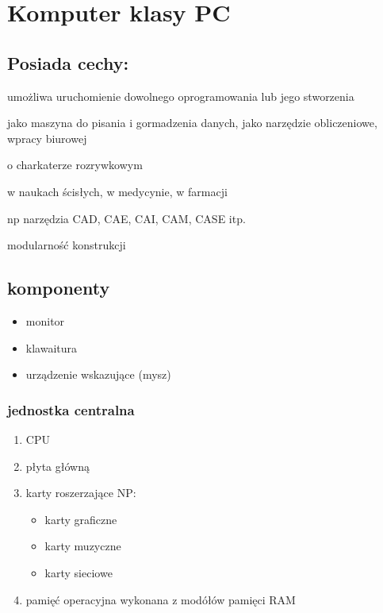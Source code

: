\documentclass[11pt]{article}
\begin{document}
\section{Komputer klasy PC}
\label{sec:orge1d6a24}
\subsection{Posiada cechy:}
\label{sec:org1cc4df4}
\begin{description}
\item[{porgramowalność}] umożliwa uruchomienie dowolnego oprogramowania lub jego stworzenia
\item[{uniwersalne zastosowania}] \begin{description}
\item[{typowo użytkowe}] jako maszyna do pisania i gormadzenia danych, jako narzędzie obliczeniowe, wpracy biurowej
\item o charkaterze rozrywkowym
\item[{badawczo-naukowe}] w naukach ścisłych, w medycynie, w farmacji
\item[{wspomagające projektowanie}] np narzędzia CAD, CAE, CAI, CAM, CASE itp.
\end{description}
\item modularność konstrukcji
\end{description}
\subsection{komponenty}
\label{sec:org72b0fcc}
\begin{itemize}
\item monitor
\item klawaitura
\item urządzenie wskazujące (mysz)
\end{itemize}
\subsubsection{jednostka centralna}
\label{sec:orga5b2842}
\begin{enumerate}
\item CPU
\label{sec:org3bec1cc}
\item płyta główną
\label{sec:org5e923db}
\item karty roszerzające
\label{sec:org350283c}
NP:
\begin{itemize}
\item karty graficzne
\item karty muzyczne
\item karty sieciowe
\end{itemize}
\item pamięć operacyjna
\label{sec:orgfb1a471}
wykonana z modółów pamięci RAM
\end{enumerate}
\end{document}
